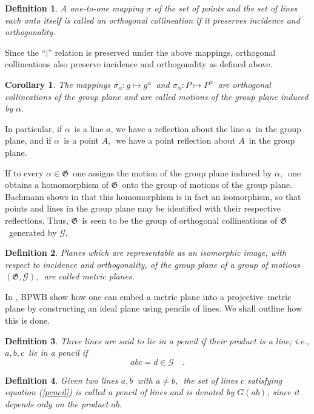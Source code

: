 \documentclass[a4paper,twoside,12pt]{article}
\newtheorem{cor}{Corollary}[section]
\newtheorem{definition}{Definition}[section]
\def\nind{\noindent}
\begin{document}
\begin{definition} A one-to-one mapping $\sigma $ of the set of points
and the set of lines each onto itself is called an \emph{orthogonal
collineation} if it preserves incidence and orthogonality.
\end{definition}

\nind Since the ``$|$'' relation is preserved under the above
mappings, orthogonal collineations also preserve incidence and
orthogonality as defined above.

\begin{cor} The mappings $\sigma _{\alpha }:g\longmapsto
g^{\alpha }$\ and $\sigma _{\alpha }:P\longmapsto P^{\alpha }$\ are
orthogonal collineations of the group plane and are called motions of the
group plane induced by $\alpha .$
\end{cor}

\nind In particular, if $\alpha $\ is a line $a$, we have a reflection
about the line $a$\ in the group plane, and if $\alpha $\ is a point
$A,$\ we have a point reflection about $A$\ in the group plane.

     If to every $\alpha \in \mathfrak{G}$\ one assigns the motion of the group
plane induced by $\alpha ,$\ one obtains a homomorphism of $\mathfrak{G}$\
onto the group of motions of the group plane. Bachmann shows in \cite{Ba} that
this homomorphism is in fact an isomorphism, so that points and lines in the
group plane may be identified with their respective reflections. Thus, 
$\mathfrak{G}$\ is seen to be the group of orthogonal collineations of 
$\mathfrak{G}$\ generated by $\mathcal{G}$.

\begin{definition} Planes which are representable as an isomorphic
image, with respect to incidence and orthogonality, of the group plane of a
group of motions $(\mathfrak{G},\mathcal{G}),$\ are called metric planes.
\end{definition}

     In \cite{BBPW}, BPWB show how one can embed a metric plane into a
projective--metric plane by constructing an ideal plane using pencils of
lines. We shall outline how this is done.

\begin{definition} Three lines are said to lie in a pencil if their
product is a line; {\it i.e.}, $a,b,c$\ lie in a pencil if 
%
\begin{equation}
abc=d \in \mathcal{G} \quad . \label{pencil}
\end{equation}
\end{definition}
%
\begin{definition} Given two lines $a,b$\ with $a\neq b,$\ the set
of lines $c$ satisfying equation (\ref{pencil}) is called a pencil of
lines and is denoted by $G(ab)$, since it depends only on the product
$ab.$
\end{definition}
\end{document}

